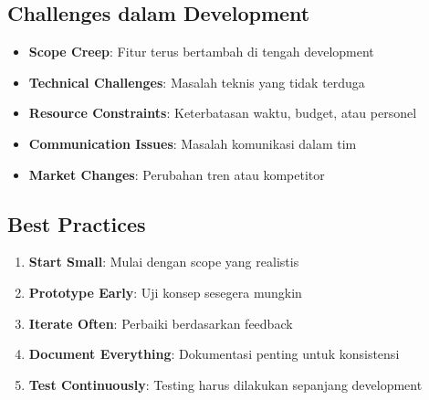\subsection{Challenges dalam Development}

\begin{itemize}
\item \textbf{Scope Creep}: Fitur terus bertambah di tengah development
\item \textbf{Technical Challenges}: Masalah teknis yang tidak terduga
\item \textbf{Resource Constraints}: Keterbatasan waktu, budget, atau personel
\item \textbf{Communication Issues}: Masalah komunikasi dalam tim
\item \textbf{Market Changes}: Perubahan tren atau kompetitor
\end{itemize}

\subsection{Best Practices}

\begin{enumerate}
\item \textbf{Start Small}: Mulai dengan scope yang realistis
\item \textbf{Prototype Early}: Uji konsep sesegera mungkin
\item \textbf{Iterate Often}: Perbaiki berdasarkan feedback
\item \textbf{Document Everything}: Dokumentasi penting untuk konsistensi
\item \textbf{Test Continuously}: Testing harus dilakukan sepanjang development
\end{enumerate}
